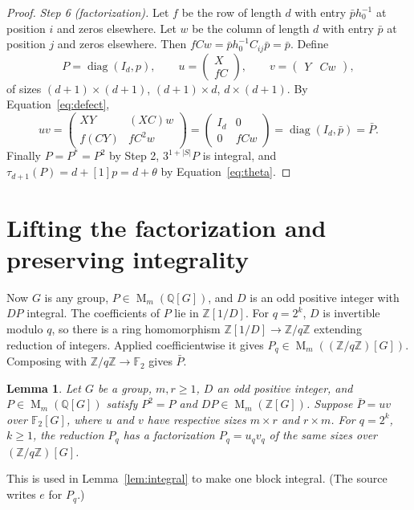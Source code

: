\documentclass[11pt]{article}
\newtheorem{lemma}[theorem]{Lemma}
\theoremstyle{remark}
\numberwithin{equation}{section}
\newcommand{\F}{\mathbb F}
\newcommand{\Z}{\mathbb Z}
\newcommand{\Q}{\mathbb Q}
\newcommand{\Mat}{\operatorname{M}}
\newcommand{\diag}{\operatorname{diag}}
\begin{document}
\begin{proof}
\emph{Step 6 (factorization).} Let $f$ be the row of length $d$ with entry $\bar ph_0^{-1}$ at position $i$ and zeros elsewhere. Let $w$ be the column of length $d$ with entry $\bar p$ at position $j$ and zeros elsewhere. Then $fCw=\bar ph_0^{-1}C_{ij}\bar p=\bar p$. Define
\[
 P=\diag(I_d,p),\qquad
 u=\begin{pmatrix}X\\fC\end{pmatrix},\qquad
 v=\begin{pmatrix}Y&Cw\end{pmatrix},
\]
of sizes $(d+1)\times(d+1)$, $(d+1)\times d$, $d\times(d+1)$. By Equation~\eqref{eq:defect},
\[
 uv=\begin{pmatrix}XY&(XC)w\\f(CY)&fC^2w\end{pmatrix}
   =\begin{pmatrix}I_d&0\\0&fCw\end{pmatrix}=\diag(I_d,\bar p)=\bar P.
\]
Finally $P=P^*=P^2$ by Step 2, $3^{1+|S|}P$ is integral, and $\tau_{d+1}(P)=d+[1]p=d+\theta$ by Equation~\eqref{eq:theta}.
\end{proof}

\section{Lifting the factorization and preserving integrality}
\label{sec:lifting}

Now $G$ is any group, $P\in\Mat_m(\Q[G])$, and $D$ is an odd positive integer with $DP$ integral. The coefficients of $P$ lie in $\Z[1/D]$. For $q=2^k$, $D$ is invertible modulo $q$, so there is a ring homomorphism $\Z[1/D]\to\Z/q\Z$ extending reduction of integers. Applied coefficientwise it gives $P_q\in\Mat_m((\Z/q\Z)[G])$. Composing with $\Z/q\Z\to\F_2$ gives $\bar P$.

\begin{lemma}\label{lem:lift}
Let $G$ be a group, $m,r\ge1$, $D$ an odd positive integer, and
$P\in\Mat_m(\Q[G])$ satisfy $P^2=P$ and
$DP\in\Mat_m(\Z[G])$. Suppose $\bar P=uv$ over $\F_2[G]$, where $u$ and $v$
have respective sizes $m\times r$ and $r\times m$. For $q=2^k$,
$k\ge1$, the reduction $P_q$ has a factorization
$P_q=u_qv_q$ of the same sizes over $(\Z/q\Z)[G]$.
\end{lemma}

This is used in Lemma~\ref{lem:integral} to make one block integral. (The source writes $e$ for $P_q$.)
\end{document}
